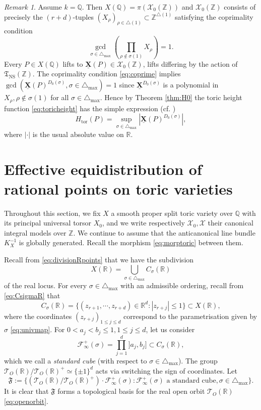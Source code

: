 \documentclass[11pt,letterpaper]{amsart}
\newcommand{\BQ}{{\mathbb {Q}}}
\newcommand{\BR}{{\mathbb {R}}}
\newcommand{\BZ}{{\mathbb {Z}}}
\newcommand{\CF}{{\mathcal {F}}}
\newcommand{\CT}{{\mathcal {T}}}
\newcommand{\CX}{{\mathcal {X}}}
\newcommand{\XX}{\underline{\mathbf{X}}}
\newcommand{\FTNS}{\mathfrak{T}_{\operatorname{NS}}}
\theoremstyle{plain}
\numberwithin{equation}{section}
\theoremstyle{definition}
\theoremstyle{remark}
\newtheorem{remark}[theorem]{Remark}
\begin{document}
\begin{remark}
	Assume $k=\BQ$. Then $X(\BQ)=\pi(\CX_0(\BZ))$ and $\CX_0(\BZ)$ consists of precisely the $(r+d)$-tuples $(X_\rho)_{\rho\in \triangle(1)}\subset\BZ^{\triangle(1)}$ satisfying the coprimality condition \begin{equation}\label{eq:coprime}
		\gcd_{\sigma\in\triangle_{\max}}\left(\prod_{\rho\notin\sigma(1)}X_\rho\right)=1.
	\end{equation} Every $P\in X(\BQ)$ lifts to $\XX(P)\in \CX_0(\BZ)$, lifts differing by the action of $\FTNS(\BZ)$. The  coprimality condition \eqref{eq:coprime} implies $\gcd\left(\XX(P)^{D_0(\sigma)},\sigma\in\triangle_{\max}\right)=1$ since $\XX^{D_0(\sigma)}$ is a polynomial in $X_\rho,\rho\notin\sigma(1)$ for all $\sigma\in\triangle_{\max}$. Hence by Theorem \ref{thm:H0} the toric height function \eqref{eq:toricheight} has the simple expression (cf. \cite[Proposition 11.3]{Salberger})
$$H_{\operatorname{tor}}(P)=\sup_{\sigma\in\triangle_{\max}}|\XX(P)^{D_0(\sigma)}|,$$ where $|\cdot|$ is the usual absolute value on $\BR$.
\end{remark}

\section{Effective equidistribution of rational points on toric varieties}\label{se:purityproof}
Throughout  this section, we fix $X$ a smooth proper split toric variety over $\BQ$ with its principal universal torsor $X_0$, and we write respectively $\CX_0,\CX$ their canonical integral models over $\BZ$. We continue to assume that the anticanonical line bundle $K_X^{-1}$ is globally generated. Recall the morphism \eqref{eq:morptoric} between them. 

 Recall from \eqref{eq:divisionRpoints} that we have the subdivision $$X(\BR)=\bigcup_{\sigma\in\triangle_{\max}}C_\sigma(\BR)$$ of the real locus. For every $\sigma\in\triangle_{\max}$ with an admissible ordering, recall from \eqref{eq:CsigmaR} that
\begin{equation*}
	C_\sigma(\BR)=\{(z_{r+1},\cdots,z_{r+d})\in\BR^d:|z_{r+j}|\leqslant 1\}\subset X(\BR),
\end{equation*} where the coordinates $(z_{r+j})_{1\leqslant j\leqslant d}$ correspond to the parametrisation given by $\sigma$ \eqref{eq:univmap}. 
 For $0<a_j<b_j\leqslant 1,1\leqslant j\leqslant d$, let us consider  \begin{equation}\label{eq:standardcube}
	\CF_\infty^+(\sigma)=\prod_{j=1}^{d}]a_j,b_j]\subset C_{\sigma}(\BR),
\end{equation} which we call a \emph{standard cube} (with respect to $\sigma\in\triangle_{\max}$).
 The group $\CT_{O}(\BR)/\CT_{O}(\BR)^+\simeq\{\pm 1\}^d$ acts via switching the sign of coordinates. Let \begin{equation}\label{eq:familyF}
 	\mathfrak{F}:=\{(\CT_{O}(\BR)/\CT_{O}(\BR)^+)\cdot\CF_\infty^+(\sigma):\CF_\infty^+(\sigma) \text{ a standard cube}, \sigma\in\triangle_{\max}\}.
 \end{equation} It is clear that $\mathfrak{F}$ forms a topological basis for the real open orbit $\CT_{O}(\BR)$ \eqref{eq:openorbit}.
\end{document}

